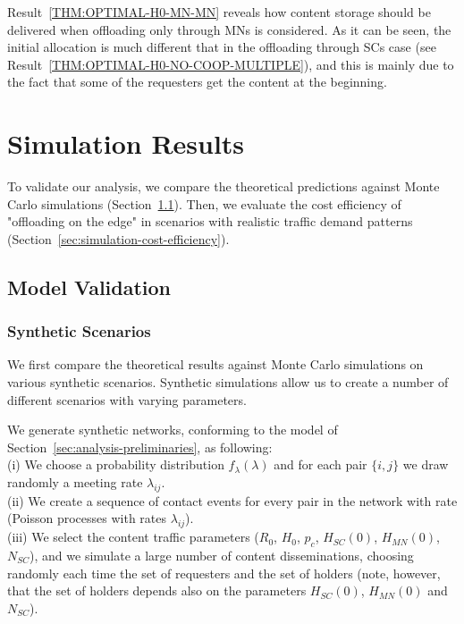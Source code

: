 \documentclass[10pt,conference,letterpaper]{IEEEtran}
\begin{document}
Result~\ref{THM:OPTIMAL-H0-MN-MN} reveals how content storage should be delivered when offloading only through MNs is considered. As it can be seen, the initial allocation is much different that in the offloading through SCs case (see Result~\ref{THM:OPTIMAL-H0-NO-COOP-MULTIPLE}), and this is mainly due to the fact that some of the requesters get the content at the beginning.






\section{Simulation Results}\label{sec:single-validation}
To validate our analysis, we compare the theoretical predictions against Monte Carlo simulations (Section~\ref{sec:model-validation}). Then, we evaluate the cost efficiency of "offloading on the edge" in scenarios with realistic traffic demand patterns (Section~\ref{sec:simulation-cost-efficiency}).


\subsection{Model Validation}\label{sec:model-validation}

\subsubsection{Synthetic Scenarios}
We first compare the theoretical results against Monte Carlo simulations on various synthetic scenarios. Synthetic simulations allow us to create a number of different scenarios with varying parameters.

We generate synthetic networks, conforming to the model of Section~\ref{sec:analysis-preliminaries}, as following:\\
(i) We choose a probability distribution $f_{\lambda}(\lambda)$ and for each pair $\{i,j\}$ we draw randomly a meeting rate $\lambda_{ij}$.\\
(ii) We create a sequence of contact events for every pair in the network with rate (Poisson processes with rates $\lambda_{ij}$).\\
(iii) We select the content traffic parameters ($R_{0}$, $H_{0}$, $p_{c}$, $H_{SC}(0)$, $H_{MN}(0)$, $N_{SC}$), and we simulate a large number of content disseminations, choosing randomly each time the set of requesters and the set of holders (note, however, that the set of holders depends also on the parameters $H_{SC}(0)$, $H_{MN}(0)$ and $N_{SC}$).
\end{document}
